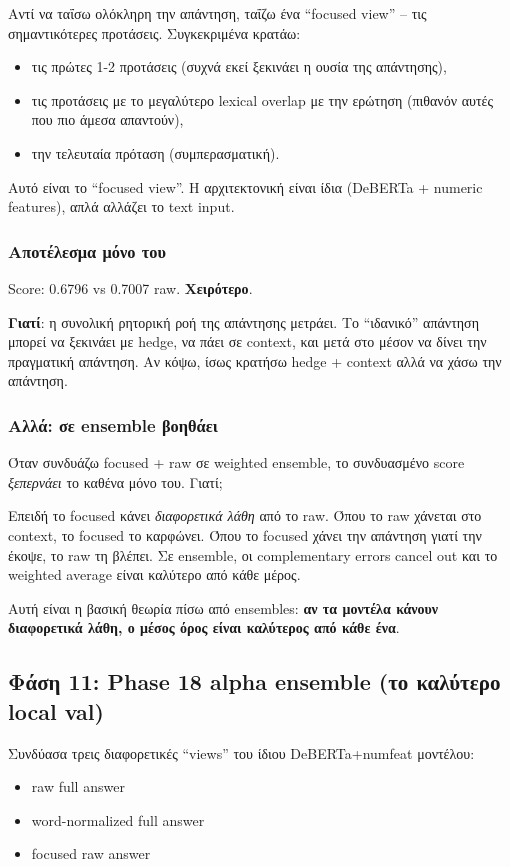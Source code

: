 \documentclass[12pt]{fphw}
\begin{document}
Αντί να ταΐσω ολόκληρη την απάντηση, ταΐζω ένα ``focused view'' -- τις σημαντικότερες προτάσεις. Συγκεκριμένα κρατάω:
\begin{itemize}
    \item τις πρώτες 1-2 προτάσεις (συχνά εκεί ξεκινάει η ουσία της απάντησης),
    \item τις προτάσεις με το μεγαλύτερο lexical overlap με την ερώτηση (πιθανόν αυτές που πιο άμεσα απαντούν),
    \item την τελευταία πρόταση (συμπερασματική).
\end{itemize}

Αυτό είναι το ``focused view''. Η αρχιτεκτονική είναι ίδια (DeBERTa + numeric features), απλά αλλάζει το text input.

\subsubsection{Αποτέλεσμα μόνο του}

Score: 0.6796 vs 0.7007 raw. \textbf{Χειρότερο}.

\textbf{Γιατί}: η συνολική ρητορική ροή της απάντησης μετράει. Το ``ιδανικό'' απάντηση μπορεί να ξεκινάει με hedge, να πάει σε context, και μετά στο μέσον να δίνει την πραγματική απάντηση. Αν κόψω, ίσως κρατήσω hedge + context αλλά να χάσω την απάντηση.

\subsubsection{Αλλά: σε ensemble βοηθάει}

Όταν συνδυάζω focused + raw σε weighted ensemble, το συνδυασμένο score \emph{ξεπερνάει} το καθένα μόνο του. Γιατί;

Επειδή το focused κάνει \emph{διαφορετικά λάθη} από το raw. Όπου το raw χάνεται στο context, το focused το καρφώνει. Όπου το focused χάνει την απάντηση γιατί την έκοψε, το raw τη βλέπει. Σε ensemble, οι complementary errors cancel out και το weighted average είναι καλύτερο από κάθε μέρος.

Αυτή είναι η βασική θεωρία πίσω από ensembles: \textbf{αν τα μοντέλα κάνουν διαφορετικά λάθη, ο μέσος όρος είναι καλύτερος από κάθε ένα}.

\subsection{Φάση 11: Phase 18 alpha ensemble (το καλύτερο local val)}

Συνδύασα τρεις διαφορετικές ``views'' του ίδιου DeBERTa+numfeat μοντέλου:
\begin{itemize}
    \item raw full answer
    \item word-normalized full answer
    \item focused raw answer
\end{itemize}
\end{document}
